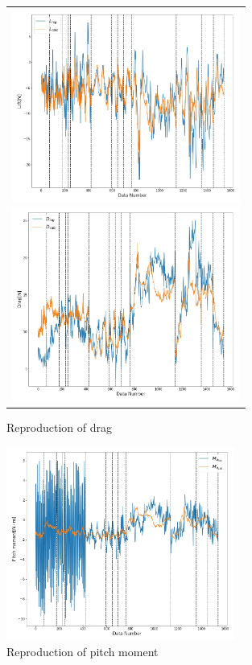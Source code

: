 \begin{figure}[htbp]
	\begin{center}
		\begin{tabular}{c}
			\begin{minipage}{0.5\hsize}
				\begin{center}
					\includegraphics[clip,width=7.5cm,bb=0 0 982 835]{./z_figure_files/chapter4/L.jpeg}
					\caption{Reproduction of lift}
					\label{fig:L_re}
				\end{center}
			\end{minipage}
			\begin{minipage}{0.5\hsize}
				\begin{center}
					\includegraphics[clip,width=7.5cm,bb=0 0 982 835]{./z_figure_files/chapter4/D.jpeg}
					\caption{Reproduction of drag}
					\label{fig:D_re}
				\end{center}
			\end{minipage}
		\end{tabular}
	\end{center}
\end{figure}
\begin{figure}[H]
  \begin{center}
    \includegraphics[clip,width=7.5cm,bb=0 0 982 835]{./z_figure_files/chapter4/Ma.jpeg}
    \caption{Reproduction of pitch moment}
    \label{fig:Ma_re}
  \end{center}
\end{figure}


